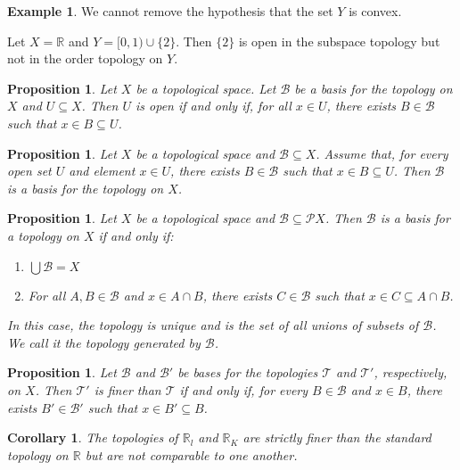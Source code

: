 \documentclass{book}
\newtheorem{prop}[ax]{Proposition}
\newtheorem{cor}{Corollary}[ax]
\theoremstyle{definition}
\newtheorem{ex}[ax]{Example}
\begin{document}
\begin{ex}
We cannot remove the hypothesis that the set $Y$ is convex.

Let $X = \mathbb{R}$ and $Y = [0,1) \cup \{2\}$. Then $\{2\}$ is open in the subspace topology but not in the order topology on $Y$.
\end{ex}

\begin{prop}
Let $X$ be a topological space. Let $\mathcal{B}$ be a basis for the topology on $X$ and $U \subseteq X$. Then $U$ is open if and only if, for all $x \in U$, there exists $B \in \mathcal{B}$ such that $x \in B \subseteq U$.
\end{prop}

\begin{prop}
Let $X$ be a topological space and $\mathcal{B} \subseteq X$. Assume that, for every open set $U$ and element $x \in U$, there exists $B \in \mathcal{B}$ such that $x \in B \subseteq U$. Then $\mathcal{B}$ is a basis for the topology on $X$.
\end{prop}

\begin{prop}
Let $X$ be a topological space and $\mathcal{B} \subseteq \mathcal{P} X$. Then $\mathcal{B}$ is a basis for a topology on $X$ if and only if:
\begin{enumerate}
\item $\bigcup \mathcal{B} = X$
\item For all $A, B \in \mathcal{B}$ and $x \in A \cap B$, there exists $C \in \mathcal{B}$ such that $x \in C \subseteq A \cap B$.
\end{enumerate}
In this case, the topology is unique and is the set of all unions of subsets of $\mathcal{B}$. We call it the topology \emph{generated} by $\mathcal{B}$.
\end{prop}

\begin{prop}
Let $\mathcal{B}$ and $\mathcal{B}'$ be bases for the topologies $\mathcal{T}$ and $\mathcal{T}'$, respectively, on $X$. Then $\mathcal{T}'$ is finer than $\mathcal{T}$ if and only if, for every $B \in \mathcal{B}$ and $x \in B$, there exists $B' \in \mathcal{B}'$ such that $x \in B' \subseteq B$.
\end{prop}

\begin{cor}
The topologies of $\mathbb{R}_l$ and $\mathbb{R}_K$ are strictly finer than the standard topology on $\mathbb{R}$ but are not comparable to one another.
\end{cor}
\end{document}
